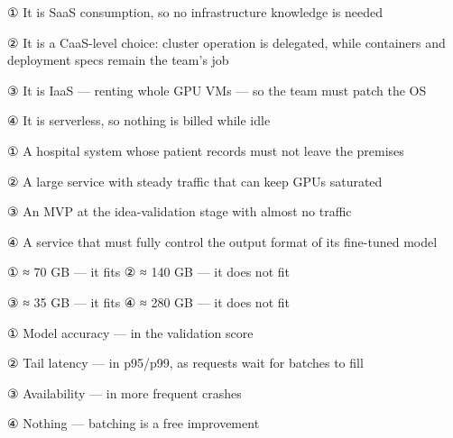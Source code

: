 \begin{tbboptions}
  \item ① It is SaaS consumption, so no infrastructure knowledge is needed
  \item ② It is a CaaS-level choice: cluster operation is delegated, while containers and deployment specs remain the team's job
  \item ③ It is IaaS — renting whole GPU VMs — so the team must patch the OS
  \item ④ It is serverless, so nothing is billed while idle
\end{tbboptions}


\begin{tbboptions}
  \item ① A hospital system whose patient records must not leave the premises
  \item ② A large service with steady traffic that can keep GPUs saturated
  \item ③ An MVP at the idea-validation stage with almost no traffic
  \item ④ A service that must fully control the output format of its fine-tuned model
\end{tbboptions}


\begin{tbboptions}
  \item ① ≈ 70 GB — it fits        ② ≈ 140 GB — it does not fit
  \item ③ ≈ 35 GB — it fits        ④ ≈ 280 GB — it does not fit
\end{tbboptions}


\begin{tbboptions}
  \item ① Model accuracy — in the validation score
  \item ② Tail latency — in p95/p99, as requests wait for batches to fill
  \item ③ Availability — in more frequent crashes
  \item ④ Nothing — batching is a free improvement
\end{tbboptions}


